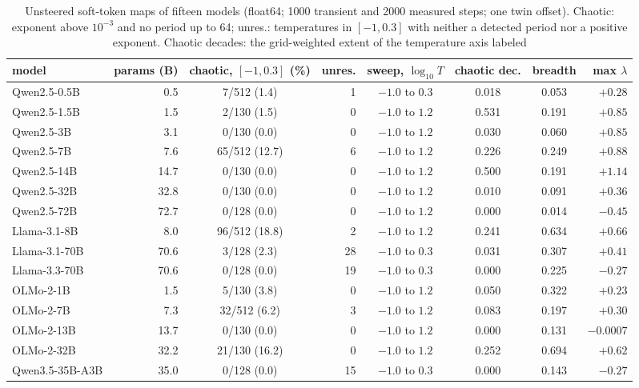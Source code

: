 \documentclass[11pt,letterpaper]{article}
\begin{document}
\begin{table}[H]
\centering\footnotesize\setlength{\tabcolsep}{4pt}
\begin{tabular}{lrcrccc r}
\toprule
model & params (B) & chaotic, $[-1,0.3]$ (\%) & unres. & sweep, $\log_{10}T$ & chaotic dec. & breadth & max $\lambda$ \\
\midrule
Qwen2.5-0.5B & 0.5 & 7/512 (1.4) & 1 & $-1.0$ to $0.3$ & 0.018 & 0.053 & $+0.28$ \\
Qwen2.5-1.5B & 1.5 & 2/130 (1.5) & 0 & $-1.0$ to $1.2$ & 0.531 & 0.191 & $+0.85$ \\
Qwen2.5-3B & 3.1 & 0/130 (0.0) & 0 & $-1.0$ to $1.2$ & 0.030 & 0.060 & $+0.85$ \\
Qwen2.5-7B & 7.6 & 65/512 (12.7) & 6 & $-1.0$ to $1.2$ & 0.226 & 0.249 & $+0.88$ \\
Qwen2.5-14B & 14.7 & 0/130 (0.0) & 0 & $-1.0$ to $1.2$ & 0.500 & 0.191 & $+1.14$ \\
Qwen2.5-32B & 32.8 & 0/130 (0.0) & 0 & $-1.0$ to $1.2$ & 0.010 & 0.091 & $+0.36$ \\
Qwen2.5-72B & 72.7 & 0/128 (0.0) & 0 & $-1.0$ to $1.2$ & 0.000 & 0.014 & $-0.45$ \\
Llama-3.1-8B & 8.0 & 96/512 (18.8) & 2 & $-1.0$ to $1.2$ & 0.241 & 0.634 & $+0.66$ \\
Llama-3.1-70B & 70.6 & 3/128 (2.3) & 28 & $-1.0$ to $0.3$ & 0.031 & 0.307 & $+0.41$ \\
Llama-3.3-70B & 70.6 & 0/128 (0.0) & 19 & $-1.0$ to $0.3$ & 0.000 & 0.225 & $-0.27$ \\
OLMo-2-1B & 1.5 & 5/130 (3.8) & 0 & $-1.0$ to $1.2$ & 0.050 & 0.322 & $+0.23$ \\
OLMo-2-7B & 7.3 & 32/512 (6.2) & 3 & $-1.0$ to $1.2$ & 0.083 & 0.197 & $+0.30$ \\
OLMo-2-13B & 13.7 & 0/130 (0.0) & 0 & $-1.0$ to $1.2$ & 0.000 & 0.131 & $-0.0007$ \\
OLMo-2-32B & 32.2 & 21/130 (16.2) & 0 & $-1.0$ to $1.2$ & 0.252 & 0.694 & $+0.62$ \\
Qwen3.5-35B-A3B & 35.0 & 0/128 (0.0) & 15 & $-1.0$ to $0.3$ & 0.000 & 0.143 & $-0.27$ \\
\bottomrule
\end{tabular}
\caption{Unsteered soft-token maps of fifteen models (float64; 1000 transient and 2000 measured steps; one twin
offset). Chaotic: exponent above $10^{-3}$ and no period up to 64; unres.: temperatures in $[-1,0.3]$ with neither a
detected period nor a positive exponent. Chaotic decades: the grid-weighted extent of the temperature axis labeled
}
\end{table}
\end{document}
